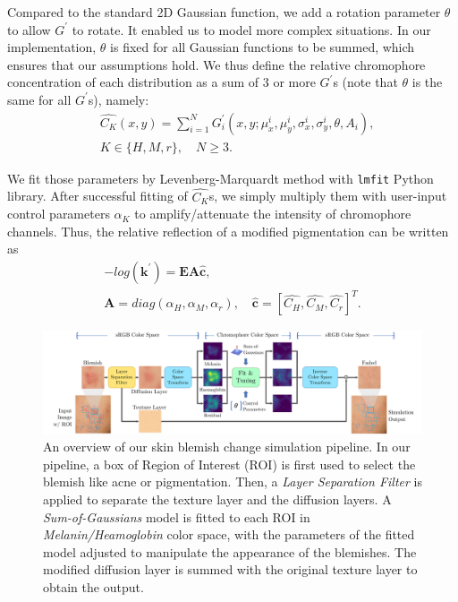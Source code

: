 \begin{spacing}{1.5}
Compared to the standard 2D Gaussian function, we add a rotation parameter $\theta$ to allow $G^\prime$ to rotate. It enabled us to model more complex situations. In our implementation, $\theta$ is fixed for all Gaussian functions to be summed, which ensures that our assumptions hold. We thus define the relative chromophore concentration of each distribution as a sum of 3 or more $G^\prime$s (note that $\theta$ is the same for all $G^\prime$s), namely:
\begin{equation}
    \begin{aligned}
         & \hat{C_K}(x,y) = \sum_{i=1}^{N}G_i^\prime(x, y; \mu_x^i, \mu_y^i, \sigma_x^i, \sigma_y^i, \theta, A_i), \\
         & K\in\{H,M,r\},\quad N\ge3.
    \end{aligned}
\end{equation}

We fit those parameters by Levenberg-Marquardt method\cite{10.1007/BFb0067700} with \texttt{lmfit} Python library\cite{newville_matthew_2014_11813}. After successful fitting of $\hat{C_K}$s, we simply multiply them with user-input control parameters $\alpha_K$ to amplify/attenuate the intensity of chromophore channels. Thus, the relative reflection of a modified pigmentation can be written as
\begin{gather*}
    -log(\mathbf{k}^\prime) = \mathbf{E}\mathbf{A}\hat{\mathbf{c}},\\
    \mathbf{A}=diag(\alpha_H, \alpha_M, \alpha_r),\quad
    \hat{\mathbf{c}} = [\hat{C_H}, \hat{C_M}, \hat{C_r}]^T.
\end{gather*}


\begin{figure}[t]
    \centering
    \includegraphics[width=0.94\columnwidth]{Chapter3/system.pdf}
    \caption{An overview of our skin blemish change simulation pipeline. In our pipeline, a box of Region of Interest (ROI) is first used to select the blemish like acne or pigmentation. Then, a \textit{Layer Separation Filter} is applied to separate the texture layer and the diffusion layers. A \textit{Sum-of-Gaussians} model is fitted to each ROI in \textit{Melanin/Heamoglobin} color space, with the parameters of the fitted model adjusted to manipulate the appearance of the blemishes. The modified diffusion layer is summed with the original texture layer to obtain the output.}
    \label{fig:system}
\end{figure}

\end{spacing}
